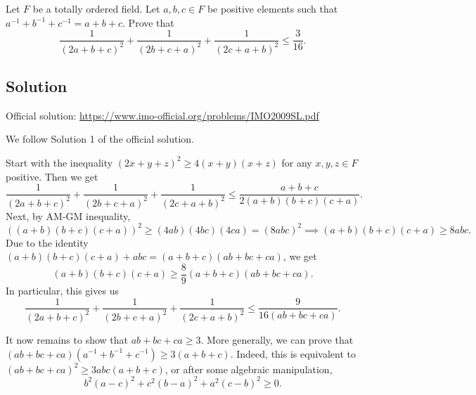 Let $F$ be a totally ordered field.
Let $a, b, c \in F$ be positive elements such that $a^{-1} + b^{-1} + c^{-1} = a + b + c$.
Prove that
\[ \frac{1}{(2a + b + c)^2} + \frac{1}{(2b + c + a)^2} + \frac{1}{(2c + a + b)^2} \leq \frac{3}{16}. \]



\subsection*{Solution}

Official solution: \url{https://www.imo-official.org/problems/IMO2009SL.pdf}

We follow Solution 1 of the official solution.

Start with the inequality $(2x + y + z)^2 \geq 4(x + y)(x + z)$ for any $x, y, z \in F$ positive.
Then we get
\[ \frac{1}{(2a + b + c)^2} + \frac{1}{(2b + c + a)^2} + \frac{1}{(2c + a + b)^2} \leq \frac{a + b + c}{2(a + b)(b + c)(c + a)}. \]
Next, by AM-GM inequality,
\[ ((a + b)(b + c)(c + a))^2 \geq (4ab)(4bc)(4ca) = (8abc)^2 \implies (a + b)(b + c)(c + a) \geq 8abc. \]
Due to the identity $(a + b)(b + c)(c + a) + abc = (a + b + c)(ab + bc + ca)$, we get
\[ (a + b)(b + c)(c + a) \geq \frac{8}{9} (a + b + c)(ab + bc + ca). \]
In particular, this gives us
\[ \frac{1}{(2a + b + c)^2} + \frac{1}{(2b + c + a)^2} + \frac{1}{(2c + a + b)^2} \leq \frac{9}{16(ab + bc + ca)}. \]

It now remains to show that $ab + bc + ca \geq 3$.
More generally, we can prove that $(ab + bc + ca)(a^{-1} + b^{-1} + c^{-1}) \geq 3(a + b + c)$.
Indeed, this is equivalent to $(ab + bc + ca)^2 \geq 3 abc (a + b + c)$, or after some algebraic manipulation,
\[ b^2 (a - c)^2 + c^2 (b - a)^2 + a^2 (c - b)^2 \geq 0. \]
